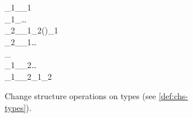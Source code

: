 \begin{figure}
\begin{subfigure}[c]{\textwidth}
  \RightFramedSignature{\ensuremath{\oplus_{\tau}\typcolon\Eval{\tau\to \Delta \tau\to \tau}}}
  \RightFramedSignature{\ensuremath{\ominus_{\tau}\typcolon\Eval{\tau\to \tau\to \Delta \tau}}}
  \RightFramedSignature{\ensuremath{\NilC{\text{\textendash}}\typcolon\Eval{\tau\to \Delta \tau}}}
  \RightFramedSignature{\ensuremath{\circledcirc_{\tau}\typcolon\Eval{\Delta \tau\to \Delta \tau\to \Delta \tau}}}
\begin{hscode}\SaveRestoreHook
{}%
%
%
%
%
\>[3]{}_{1}\;\oplus_{\sigma\to \tau}\;{}\<[36]%
\>[36]{}\<[41]%
\>[41]{}\mathrel{=}\lambda {}\to {}_{1}\;\oplus {}\;\;\<[E]%
\\
\>[3]{}_{1}\;\oplus_{\iota}\;{}\<[36]%
\>[36]{}\<[41]%
\>[41]{}\mathrel{=}\ldots{}\<[E]%
\\
\>[3]{}_{2}\;\ominus_{\sigma\to \tau}\;{}\<[36]%
\>[36]{}_{1}{}\<[41]%
\>[41]{}\mathrel{=}\lambda {}\;\to {}_{2}\;(\oplus {})\ominus {}_{1}\;\<[E]%
\\
\>[3]{}_{2}\;\ominus_{\iota}\;{}\<[36]%
\>[36]{}_{1}{}\<[41]%
\>[41]{}\mathrel{=}\ldots{}\<[E]%
\\
\>[3]{}\<[41]%
\>[41]{}\mathrel{=}\;\ominus_{\tau}\;\<[E]%
\\
\>[3]{}_{1}\;\circledcirc_{\iota}\;{}\<[36]%
\>[36]{}_{2}{}\<[41]%
\>[41]{}\mathrel{=}\ldots{}\<[E]%
\\
\>[3]{}_{1}\;\circledcirc_{\sigma\to \tau}\;{}\<[36]%
\>[36]{}_{2}{}\<[41]%
\>[41]{}\mathrel{=}\lambda {}\;\to {}_{1}\;\;\circledcirc {}_{2}\;\;\<[E]%
\ColumnHook
\end{hscode}\resethooks
\caption{Change structure operations on types (see \cref{def:chs-types}).}
\label{fig:chs-types}
\end{subfigure}
\begin{subfigure}[c]{\textwidth}
  \RightFramedSignature{\ensuremath{\oplus_{\Gamma}\typcolon\Eval{\Gamma\to \Delta \Gamma\to \Gamma}}}
  \RightFramedSignature{\ensuremath{\ominus_{\Gamma}\typcolon\Eval{\Gamma\to \Gamma\to \Delta \Gamma}}}

\end{subfigure}
\end{figure}
